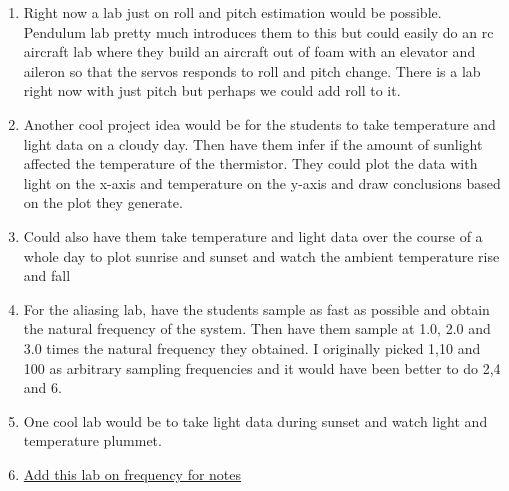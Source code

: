 \documentclass{article}
\begin{document}
\begin{enumerate}[itemsep=-5pt]
\item Right now a lab just on roll and pitch estimation would be possible. Pendulum lab pretty much introduces them to this but could easily do an rc aircraft lab where they build an aircraft out of foam with an elevator and aileron so that the servos responds to roll and pitch change. There is a lab right now with just pitch but perhaps we could add roll to it.
\item Another cool project idea would be for the students to take temperature and light data on a cloudy day. Then have them infer if the amount of sunlight affected the temperature of the thermistor. They could plot the data with light on the x-axis and temperature on the y-axis and draw conclusions based on the plot they generate.
\item Could also have them take temperature and light data over the course of a whole day to plot sunrise and sunset and watch the ambient temperature rise and fall
\item For the aliasing lab, have the students sample as fast as possible and obtain the natural frequency of the system. Then have them sample at 1.0, 2.0 and 3.0 times the natural frequency they obtained. I originally picked 1,10 and 100 as arbitrary sampling frequencies and it would have been better to do 2,4 and 6.
\item One cool lab would be to take light data during sunset and watch light and temperature plummet.
\item \href{https://learn.adafruit.com/circuit-playground-o-phonor/musical-note-basics}{Add this lab on frequency for notes}
\end{enumerate}

\newpage


































\end{document}
